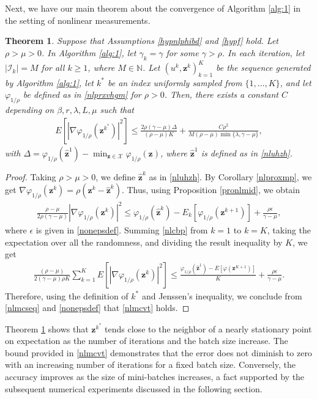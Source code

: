 \documentclass[10pt,reqno]{amsart}
\newcommand{\1}{{\chi}}
\def\leq{\leqslant}
\def\geq{\geqslant}
\numberwithin{equation}{section}
\theoremstyle{thmlemcorr}
\newtheorem{theorem}{Theorem}
\numberwithin{theorem}{section}
\theoremstyle{thmlemcorr*}
\theoremstyle{defi}
\theoremstyle{remexample}
\theoremstyle{ass}
\begin{document}
Next, we have our main theorem about the convergence of Algorithm \ref{alg:1} in the setting of nonlinear measurements. 
\begin{theorem}
	\label{nlmt}
	Suppose that Assumptions \ref{hypnlphibd} and \ref{hypf}  hold. Let $\rho>\mu>0$. In Algorithm \ref{alg:1}, let $\gamma_k = \gamma$ for some $\gamma>\rho$. In each iteration, let $|\mathcal{I}_k|=M$ for all $k\geq 1$, where $M\in \mathbb{N}$. Let $(u^{k}, \boldsymbol{z}^k)_{k=1}^K$ be the sequence generated by Algorithm \ref{alg:1},  let $k^*$ be an index uniformly sampled from $\{1, \dots, K\}$, and let $\varphi_{1/\rho}$ be defined as in \eqref{nlprxvhgm} for $\rho>0$. Then, there exists a constant $C$ depending on $\beta, r, \lambda, L, \mu$ such that
	\begin{align}
		\label{nlmcvt}
		E[|\nabla \varphi_{1/\rho}(\boldsymbol{z}^{k^*})|^2] \leq \frac{2\rho(\gamma - \mu)\Delta}{(\rho - \mu)K} + \frac{C\rho^2}{M(\rho-\mu)\min\{\lambda, \gamma-\mu\}},
	\end{align}
with $\Delta = \varphi_{1/\rho}(\hat{\boldsymbol{z}}^1) - \min_{\boldsymbol{z}\in \mathcal{X}}\varphi_{1/\rho}(\boldsymbol{z})$, where $\hat{\boldsymbol{z}}^1$ is defined as in \eqref{nluhzh}. 
\end{theorem}
\begin{proof}
	Taking $\rho>\mu>0$, we define  $\hat{\boldsymbol{z}}^k$ as  in \eqref{nluhzh}. By Corollary \ref{nlproxmp}, we get $\nabla \varphi_{1/\rho}(\boldsymbol{z}^k) = \rho(\boldsymbol{z}^k - \hat{\boldsymbol{z}}^k)$.  Thus, using Proposition \ref{pronlmid}, we obtain
	\begin{align}
		\label{nlcbp}
		\frac{\rho - \mu}{2\rho(\gamma - \mu)}|\nabla\varphi_{1/\rho}(\boldsymbol{z}^k)|^2 \leq \varphi_{1/\rho}(\hat{\boldsymbol{z}}^k) - E_k[\varphi_{1/\rho}(\boldsymbol{z}^{k+1})] + \frac{\rho\epsilon}{\gamma - \mu},
	\end{align}
	where $\epsilon$ is given in \eqref{nonepsdef}. 
	Summing \eqref{nlcbp} from $k=1$ to $k=K$, taking the expectation over all the randomness, and dividing the result inequality by $K$, we get
	\begin{align}
		\label{nlmcseq}
		\frac{(\rho - \mu)}{2(\gamma - \mu)\rho K}\sum_{k=1}^KE[|\nabla\varphi_{1/\rho}(\boldsymbol{z}^k)|^2] \leq \frac{\varphi_{1/\rho}(\hat{\boldsymbol{z}}^1) - E[\varphi(\boldsymbol{z}^{K+1})]}{K} + \frac{\rho \epsilon}{\gamma - \mu}. 
	\end{align}
	Therefore, using the definition of $k^*$ and Jenssen's inequality, we conclude from \eqref{nlmcseq} and \eqref{nonepsdef} that \eqref{nlmcvt} holds. 
\end{proof}
Theorem \ref{nlmt} shows that $\boldsymbol{z}^{k^*}$ tends close to the neighbor of a nearly stationary point on expectation as the number of iterations and the batch size increase. 
The bound provided in \eqref{nlmcvt} demonstrates that the error does not diminish to zero with an increasing number of iterations for a fixed batch size. Conversely, the accuracy improves as the size of mini-batches increases, a fact supported by the subsequent numerical experiments discussed in the following section.
\end{document}
